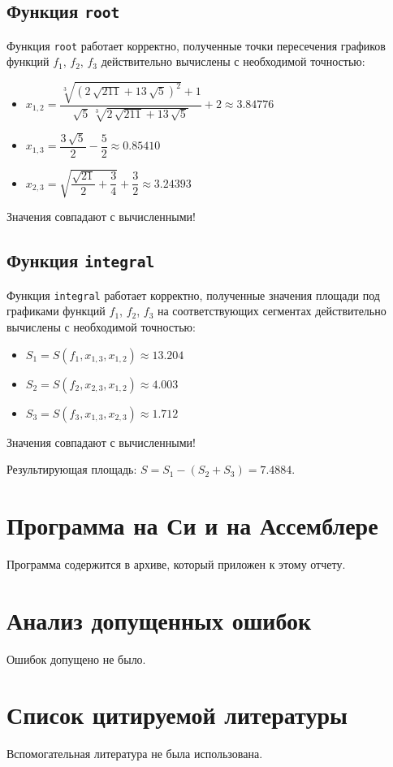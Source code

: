 \documentclass[a4paper,12pt,titlepage,finall]{article}
\begin{document}
\subsection{Функция \texttt{root}}
Функция \texttt{root} работает корректно, полученные точки пересечения графиков функций $f_1$, $f_2$, $f_3$ действительно вычислены с необходимой точностью:
\begin{itemize}
	\item $x_{1,2}=\dfrac{\sqrt[{3}]{\left(2\,\sqrt{211}+13\,\sqrt{5}\right)^{2}}+1}{\sqrt{5}\,\sqrt[{3}]{2\,\sqrt{211}+13\,\sqrt{5}}}+2 \approx 3.84776$
	\item $x_{1,3}=\dfrac{3\,\sqrt{5}}{2}-\dfrac{5}{2} \approx 0.85410$
	\item $x_{2,3}=\sqrt{\dfrac{\sqrt{21}}{2}+\dfrac{3}{4}}+\dfrac{3}{2} \approx 3.24393$
\end{itemize}

Значения совпадают с вычисленными!

\subsection{Функция \texttt{integral}}

Функция \texttt{integral} работает корректно, полученные значения площади под графиками функций $f_1$, $f_2$, $f_3$ на соответствующих сегментах действительно вычислены с необходимой точностью:
\begin{itemize}
	\item $S_1 = S(f_1, x_{1,3}, x_{1,2}) \approx 13.204$
	\item $S_2 = S(f_2, x_{2,3}, x_{1,2})  \approx 4.003$
	\item $S_3 = S(f_3, x_{1,3}, x_{2,3})  \approx 1.712$
\end{itemize}

Значения совпадают с вычисленными! 

Результирующая площадь: $S=S_1-(S_2+S_3) = 7.4884$.

\newpage

\section{Программа на Си и на Ассемблере}
Программа содержится в архиве, который приложен к этому отчету.

\newpage

\section{Анализ допущенных ошибок}
Ошибок допущено не было.


\newpage

\section{Список цитируемой литературы}
Вспомогательная литература не была использована.
\end{document}
